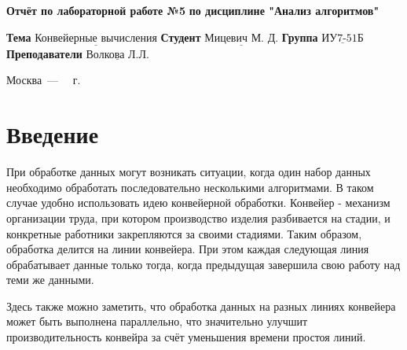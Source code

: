 \documentclass[12pt]{report}
\begin{document}
\begin{titlepage}
	
	\begin{center}
		\noindent\begin{minipage}{1.3\textwidth}\centering
			\Large\textbf{  Отчёт по лабораторной работе №5}\newline
			\textbf{по дисциплине "Анализ алгоритмов"}\newline\newline
		\end{minipage}
	\end{center}
	
	\noindent\textbf{Тема} $\underline{\text{Конвейерные вычисления}}$\newline\newline
	\noindent\textbf{Студент} $\underline{\text{Мицевич М. Д.}}$\newline\newline
	\noindent\textbf{Группа} $\underline{\text{ИУ7-51Б}}$\newline\newline
	\noindent\textbf{Преподаватели} $\underline{\text{Волкова Л.Л.}}$\newline\newline\newline
	
	\begin{center}
		\vfill
		Москва~---~\the\year
		~г.
	\end{center}
\end{titlepage}

\setcounter{page}{2}
\tableofcontents

\newpage
\chapter*{Введение}

При обработке данных могут возникать ситуации, когда один набор данных необходимо обработать последовательно несколькими алгоритмами. В таком случае удобно использовать идею конвейерной обработки. Конвейер - механизм организации труда, при котором производство изделия разбивается на стадии, и конкретные работники закрепляются за своими стадиями. Таким образом, обработка делится на линии конвейера. При этом каждая следующая линия обрабатывает данные только тогда, когда предыдущая завершила свою работу над теми же данными. 

Здесь также можно заметить, что обработка данных на разных линиях конвейера может быть выполнена параллельно, что значительно улучшит производительность конвейра за счёт уменьшения времени простоя линий.
\end{document}
